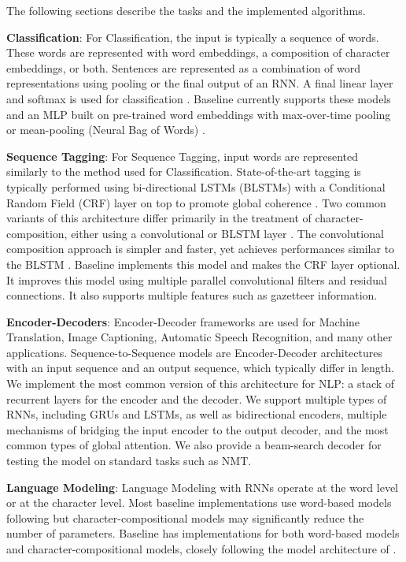 \documentclass[11pt,a4paper]{article}
\begin{document}
The following sections describe the tasks and the implemented algorithms. 

\textbf{Classification}: For Classification, the input is typically a sequence of words. These words are represented with word embeddings, a composition of character embeddings, or both. Sentences are represented as a combination of word representations using pooling or the final output of an RNN. A final linear layer and softmax is used for classification \cite{DBLP:conf/emnlp/Kim14:14,journals/jmlr/CollobertWBKKK11:11}. Baseline currently supports these models and an MLP built on pre-trained word embeddings with max-over-time pooling or mean-pooling (Neural Bag of Words) \cite{kalchbrenner2014convolutional:14}. 

\textbf{Sequence Tagging}: For Sequence Tagging, input words are represented similarly to the method used for Classification. State-of-the-art tagging is typically performed using bi-directional LSTMs (BLSTMs) with a Conditional Random Field (CRF) layer on top to promote global coherence \cite{Lample2016NeuralAF:16, ma-hovy:2016:P16-1:16, Peters2017SemisupervisedST:17}. Two common variants of this architecture differ primarily in the treatment of character-composition, either using a convolutional \cite{DosSantos:2014:LCR:3044805.3045095:14} or BLSTM layer \cite{Ling2015FindingFI:17}. The convolutional composition approach is simpler and faster, yet achieves performances similar to the BLSTM \cite{D17-1035:17}. Baseline implements this model and makes the CRF layer optional. It improves this model using multiple parallel convolutional filters and residual connections. It also supports multiple features such as gazetteer information. 


\textbf{Encoder-Decoders}: Encoder-Decoder frameworks are used for Machine Translation, Image Captioning, Automatic Speech Recognition, and many other applications. Sequence-to-Sequence models are Encoder-Decoder architectures with an input sequence and an output sequence, which typically differ in length. We implement the most common version of this architecture for NLP: a stack of recurrent layers for the encoder and the decoder. We support multiple types of RNNs, including GRUs and LSTMs, as well as bidirectional encoders, multiple mechanisms of bridging the input encoder to the output decoder, and the most common types of global attention. We also provide a beam-search decoder for testing the model on standard tasks such as NMT.

\textbf{Language Modeling}: Language Modeling with RNNs operate at the word level or at the character level. Most baseline implementations use word-based models following \cite{Zaremba2014RecurrentNN:14} but character-compositional models \cite{Kim2016CharacterAwareNL:16, Jzefowicz2016ExploringTL:16} may significantly reduce the number of parameters. Baseline has implementations for both word-based models and character-compositional models, closely following the model architecture of .
\end{document}
